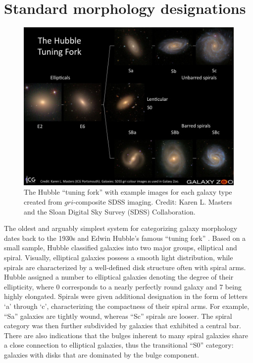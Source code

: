 \section{Standard morphology designations}


\begin{figure}
\centering
\includegraphics[width=5in]{Figures/Masters_tuningfork.jpg}
\caption[Hubble tuning fork]{The Hubble ``tuning fork'' with example images for each galaxy type created from $gri$-composite SDSS imaging. Credit: Karen L. Masters and the Sloan Digital Sky Survey (SDSS) Collaboration.}
\label{fig: tuning fork}
\end{figure}

The oldest and arguably simplest system for categorizing galaxy morphology dates back to the 1930s and Edwin Hubble's famous ``tuning fork'' \citep{Hubble1926, Hubble1936}. Based on a small sample, Hubble classified galaxies into two major groups, elliptical and spiral. Visually, elliptical galaxies possess a smooth light distribution, while spirals are characterized by a well-defined disk structure often with spiral arms. Hubble assigned a number to elliptical galaxies denoting the degree of their ellipticity, where 0 corresponds to a nearly perfectly round galaxy and 7 being highly elongated. Spirals were given additional designation in the form of letters `a' through `c', characterizing the compactness of their spiral arms. For example, ``Sa'' galaxies are tightly wound, whereas ``Sc'' spirals are looser. The spiral category was then further subdivided by galaxies that exhibited a central bar. There are also indications that the bulges inherent to many spiral galaxies share a close connection to elliptical galaxies, thus the transitional ``S0'' category: galaxies with disks that are dominated by the bulge component. 

